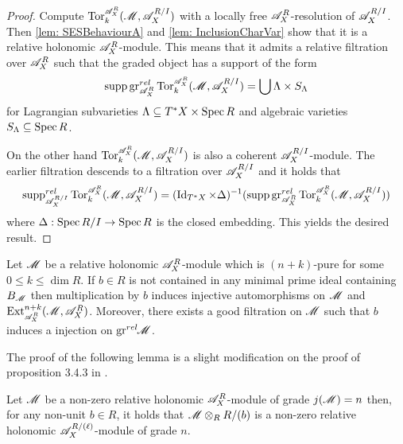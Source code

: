 \begin{proof}
  Compute $\Tr{\A_X^R}{k}(\M, \A_X^{R/I})$ with a locally free $\mathscr{A}_X^R$-resolution of $\mathscr{A}_X^{R/I}$.
  Then \cref{lem: SESBehaviourA} and \cref{lem: InclusionCharVar} show that it is a relative holonomic $\mathscr{A}_X^R$-module.
  This means that it admits a relative filtration over $\mathscr{A}_X^R$ such that the graded object has a support of the form
  $$\supp \gr_{\A_X^R}^{rel} \Tr{\A_X^R}{k}(\M, \A_X^{R/I}) = \bigcup \Lambda \times S_\Lambda$$
  for Lagrangian subvarieties $\Lambda \subseteq T^* X \times \operatorname{Spec} R$ and algebraic varieties $S_\Lambda \subseteq \operatorname{Spec} R$.

  On the other hand $\Tr{\A_X^R}{k}(\M, \A_X^{R/I})$ is also a coherent $\mathscr{A}_X^{R/I}$-module.
  The earlier filtration descends to a filtration over $\mathscr{A}_X^{R/I}$ and it holds that
  $$\supp_{\A_X^{R/I}}^{rel} \Tr{\A_X^R}{k}(\M, \A_X^{R/I}) =(\Id_{T^*X} \times \Delta)^{-1}(\supp \gr_{\A_X^R}^{rel} \Tr{\A_X^R}{k}(\M, \A_X^{R/I}))$$
  where $\Delta:\operatorname{Spec} R/I\to \operatorname{Spec} R$ is the closed embedding.
  This yields the desired result.
\end{proof}
\begin{lemma}\label{lem: NotBernsteinInjectiveAutomorphism}
  Let $\mathscr{M}$ be a relative holonomic $\mathscr{A}_X^R$-module which is $(n+k)$-pure for some $0\leq k \leq \dim R$. If $b\in R$ is not contained in any minimal prime ideal containing $B_{\mathscr{M}}$ then multiplication by $b$ induces injective automorphisms on $\mathscr{M}$ and $\Ex{\A_X^R}{n+k}(\M,\A_X^R)$. Moreover, there exists a good filtration on $\mathscr{M}$ such that $b$ induces a injection on $\operatorname{gr}^{rel}\mkern-5mu \mathscr{M}$.
\end{lemma}
The proof of the following lemma is a slight modification on the proof of proposition 3.4.3 in \cite{budur2019zero}.
\begin{lemma}\label{lem: RestrictToCM}
  Let $\mathscr{M}$ be a non-zero relative holonomic $\mathscr{A}_X^R$-module of grade $j(\mathscr{M}) = n$  then, for any non-unit $b\in R$, it holds that $\mathscr{M} \otimes_R R/(b)$ is a non-zero relative holonomic  $\mathscr{A}_X^{R/(\ell)}$-module of grade $n$.
\end{lemma}
